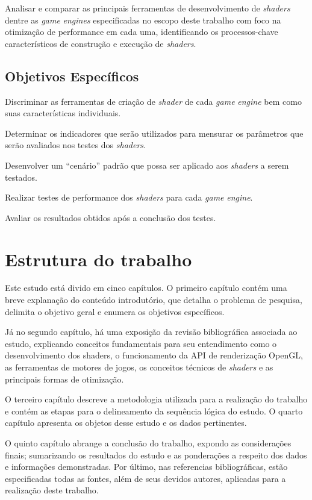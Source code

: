 Analisar e comparar as principais ferramentas de desenvolvimento de \textit{shaders} dentre as \textit{game} \textit{engines} especificadas no escopo deste trabalho com foco na otimização de performance em cada uma, identificando os processos-chave característicos de construção e execução de \textit{shaders}.

\subsection{Objetivos Específicos}
\label{sec:objetivos-especificos}

	\begin{alineas}
		\item Discriminar as ferramentas de criação de \textit{shader} de cada \textit{game} \textit{engine} bem como suas características individuais.
		\item Determinar os indicadores que serão utilizados para mensurar os parâmetros que serão avaliados nos testes dos \textit{shaders}.
		\item Desenvolver um “cenário” padrão que possa ser aplicado aos \textit{shaders} a serem testados.
		\item Realizar testes de performance dos \textit{shaders} para cada \textit{game} \textit{engine}.
		\item Avaliar os resultados obtidos após a conclusão dos testes.
	\end{alineas}

\section{Estrutura do trabalho}
\label{sec:estrutura}

Este estudo está divido em cinco capítulos. O primeiro capítulo contém uma breve explanação do conteúdo introdutório, que detalha o problema de pesquisa, delimita o objetivo geral e enumera os objetivos específicos.

Já no segundo capítulo, há uma exposição da revisão bibliográfica associada ao estudo, explicando conceitos fundamentais para seu entendimento como o desenvolvimento dos shaders, o funcionamento da API de renderização OpenGL, as ferramentas de motores de jogos, os conceitos técnicos de \textit{shaders} e as principais formas de otimização.

O terceiro capítulo descreve a metodologia utilizada para a realização do trabalho e contém as etapas para o delineamento da sequência lógica do estudo. O quarto capítulo apresenta os objetos desse estudo e os dados pertinentes.

O quinto capítulo abrange a conclusão do trabalho, expondo as considerações finais; sumarizando os resultados do estudo e as ponderações a respeito dos dados e informações demonstradas. Por último, nas referencias bibliográficas, estão especificadas todas as fontes, além de seus devidos autores, aplicadas para a realização deste trabalho.
